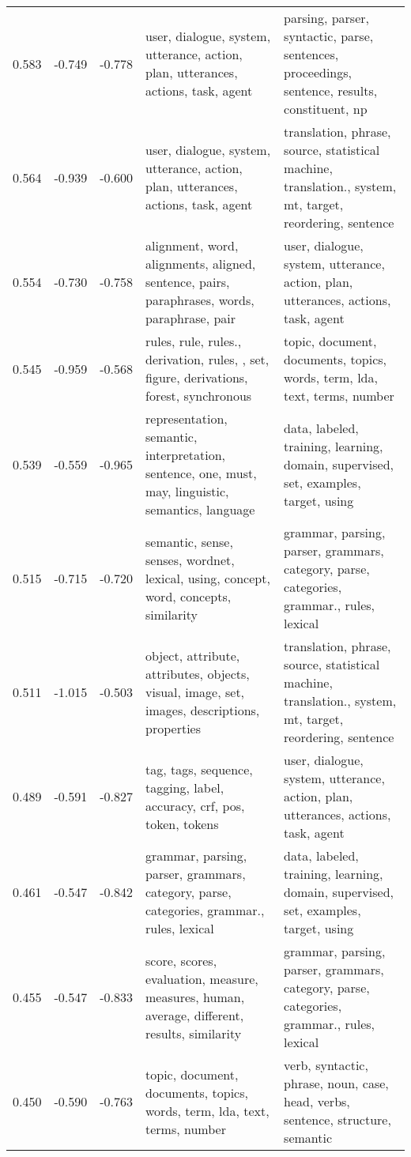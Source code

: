 \begin{tabular}{cccp{5cm}p{5cm}}
0.583 & -0.749 & -0.778 & user, dialogue, system, utterance, action, plan, utterances, actions, task, agent & parsing, parser, syntactic, parse, sentences, proceedings, sentence, results, constituent, np \\
0.564 & -0.939 & -0.600 & user, dialogue, system, utterance, action, plan, utterances, actions, task, agent & translation, phrase, source, statistical machine, translation., system, mt, target, reordering, sentence \\
0.554 & -0.730 & -0.758 & alignment, word, alignments, aligned, sentence, pairs, paraphrases, words, paraphrase, pair & user, dialogue, system, utterance, action, plan, utterances, actions, task, agent \\
0.545 & -0.959 & -0.568 & rules, rule, rules., derivation, rules, , set, figure, derivations, forest, synchronous & topic, document, documents, topics, words, term, lda, text, terms, number \\
0.539 & -0.559 & -0.965 & representation, semantic, interpretation, sentence, one, must, may, linguistic, semantics, language & data, labeled, training, learning, domain, supervised, set, examples, target, using \\
0.515 & -0.715 & -0.720 & semantic, sense, senses, wordnet, lexical, using, concept, word, concepts, similarity & grammar, parsing, parser, grammars, category, parse, categories, grammar., rules, lexical \\
0.511 & -1.015 & -0.503 & object, attribute, attributes, objects, visual, image, set, images, descriptions, properties & translation, phrase, source, statistical machine, translation., system, mt, target, reordering, sentence \\
0.489 & -0.591 & -0.827 & tag, tags, sequence, tagging, label, accuracy, crf, pos, token, tokens & user, dialogue, system, utterance, action, plan, utterances, actions, task, agent \\
0.461 & -0.547 & -0.842 & grammar, parsing, parser, grammars, category, parse, categories, grammar., rules, lexical & data, labeled, training, learning, domain, supervised, set, examples, target, using \\
0.455 & -0.547 & -0.833 & score, scores, evaluation, measure, measures, human, average, different, results, similarity & grammar, parsing, parser, grammars, category, parse, categories, grammar., rules, lexical \\
0.450 & -0.590 & -0.763 & topic, document, documents, topics, words, term, lda, text, terms, number & verb, syntactic, phrase, noun, case, head, verbs, sentence, structure, semantic \\

\end{tabular}
